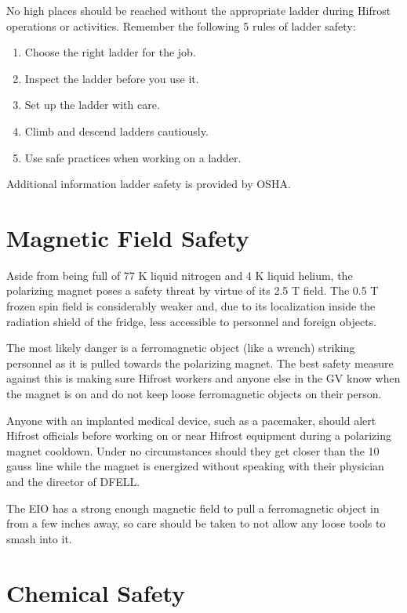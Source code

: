 No high places should be reached without the appropriate ladder during Hifrost operations or activities.  Remember the following 5 rules of ladder safety\cite{laddersafety-duke}:
\begin{enumerate}
 \item Choose the right ladder for the job.
 \item Inspect the ladder before you use it.
 \item Set up the ladder with care.
 \item Climb and descend ladders cautiously.
 \item Use safe practices when working on a ladder.
\end{enumerate}

Additional information ladder safety is provided by OSHA\cite{laddersafety-osha}.

\section{Magnetic Field Safety}

Aside from being full of 77 K liquid nitrogen and 4 K liquid helium, the polarizing magnet poses a safety threat by virtue of its 2.5 T field.  The 0.5 T frozen spin field is considerably weaker and, due to its localization inside the radiation shield of the fridge, less accessible to personnel and foreign objects.

The most likely danger is a ferromagnetic object (like a wrench) striking personnel as it is pulled towards the polarizing magnet\cite{magnetsafety}.  The best safety measure against this is making sure Hifrost workers and anyone else in the GV know when the magnet is on and do not keep loose ferromagnetic objects on their person.

Anyone with an implanted medical device, such as a pacemaker, should alert Hifrost officials before working on or near Hifrost equipment during a polarizing magnet cooldown.  Under no circumstances should they get closer than the 10 gauss line while the magnet is energized without speaking with their physician and the director of DFELL\cite{pacemakersafety}.

The EIO has a strong enough magnetic field to pull a ferromagnetic object in from a few inches away, so care should be taken to not allow any loose tools to smash into it.

\section{Chemical Safety}
